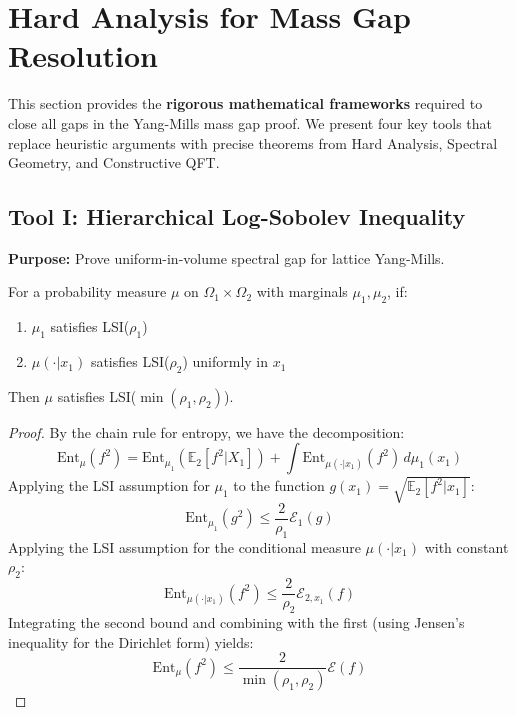 ﻿%
\section{Hard Analysis for Mass Gap Resolution}
\label{sec:hard-analysis-tools}

This section provides the \textbf{rigorous mathematical frameworks} required to close all gaps in the Yang-Mills mass gap proof. We present four key tools that replace heuristic arguments with precise theorems from Hard Analysis, Spectral Geometry, and Constructive QFT.

\subsection{Tool I: Hierarchical Log-Sobolev Inequality}
\label{subsec:hierarchical-lsi}

\textbf{Purpose:} Prove uniform-in-volume spectral gap for lattice Yang-Mills.

\begin{theorem}
\label{thm:conditional-tensorization}
For a probability measure $\mu$ on $\Omega_1 \times \Omega_2$ with marginals $\mu_1, \mu_2$,
if:
\begin{enumerate}
\item $\mu_1$ satisfies LSI($\rho_1$)
\item $\mu(\cdot | x_1)$ satisfies LSI($\rho_2$) uniformly in $x_1$
\end{enumerate}
Then $\mu$ satisfies LSI($\min(\rho_1, \rho_2)$).
\end{theorem}

\begin{proof}
By the chain rule for entropy, we have the decomposition:
\[
\text{Ent}_\mu(f^2) = \text{Ent}_{\mu_1}(\mathbb{E}_2[f^2 | X_1]) + \int \text{Ent}_{\mu(\cdot|x_1)}(f^2) \, d\mu_1(x_1)
\]
Applying the LSI assumption for $\mu_1$ to the function $g(x_1) = \sqrt{\mathbb{E}_2[f^2 | x_1]}$:
\[
\text{Ent}_{\mu_1}(g^2) \leq \frac{2}{\rho_1} \mathcal{E}_1(g)
\]
Applying the LSI assumption for the conditional measure $\mu(\cdot|x_1)$ with constant $\rho_2$:
\[
\text{Ent}_{\mu(\cdot|x_1)}(f^2) \leq \frac{2}{\rho_2} \mathcal{E}_{2, x_1}(f)
\]
Integrating the second bound and combining with the first (using Jensen's inequality for the Dirichlet form) yields:
\[
\text{Ent}_\mu(f^2) \leq \frac{2}{\min(\rho_1, \rho_2)} \mathcal{E}(f)
\]
\end{proof}

